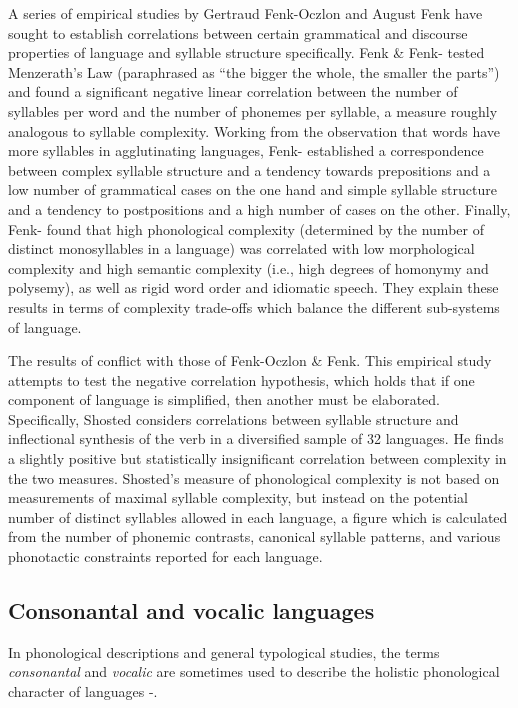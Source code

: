   A series of empirical studies by Gertraud Fenk-Oczlon and August Fenk have sought to establish correlations between certain grammatical and discourse properties of language and syllable structure specifically. Fenk \& Fenk-\citet{Oczlon1993} tested Menzerath’s Law (paraphrased as “the bigger the whole, the smaller the parts”) and found a significant negative linear correlation between the number of syllables per word and the number of phonemes per syllable, a measure roughly analogous to syllable complexity. Working from the observation that words have more syllables in agglutinating languages, Fenk-\citet{OczlonFenk2005} established a correspondence between complex syllable structure and a tendency towards prepositions and a low number of grammatical cases on the one hand and simple syllable structure and a tendency to postpositions and a high number of cases on the other. Finally, Fenk-\citet{OczlonFenk2008} found that high phonological complexity (determined by the number of distinct monosyllables in a language) was correlated with low morphological complexity and high semantic complexity (i.e., high degrees of homonymy and polysemy), as well as rigid word order and idiomatic speech. They explain these results in terms of complexity trade-offs which balance the different sub-systems of language.

  The results of \citet{Shosted2006} conflict with those of Fenk-Oczlon \& Fenk. This empirical study attempts to test the negative correlation hypothesis, which holds that if one component of language is simplified, then another must be elaborated. Specifically, Shosted considers correlations between syllable structure and inflectional synthesis of the verb in a diversified sample of 32 languages. He finds a slightly positive but statistically insignificant correlation between complexity in the two measures. Shosted’s measure of phonological complexity is not based on measurements of maximal syllable complexity, but instead on the potential number of distinct syllables allowed in each language, a figure which is calculated from the number of phonemic contrasts, canonical syllable patterns, and various phonotactic constraints reported for each language.

\subsection{Consonantal and vocalic languages}\label{sec:1.3.3}

  In phonological descriptions and general typological studies, the terms \textit{consonantal} and \textit{vocalic} are sometimes used to describe the holistic phonological character of languages -.

